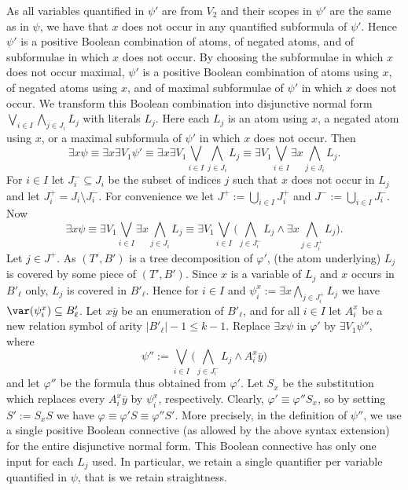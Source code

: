 \documentclass{LMCS}
\renewcommand{\phi}{\varphi}
\begin{document}
As all variables quantified in $\psi'$ are from $V_2$ 
and their scopes in $\psi'$ are the same as in $\psi$, 
we have that $x$ does not occur in any quantified subformula of $\psi'$. 
Hence $\psi'$ is a positive Boolean combination 
of atoms, of negated atoms, and of subformulae in which $x$ does not occur. 
By choosing the subformulae in which $x$ does not occur maximal, 
$\psi'$ is a positive Boolean combination 
of atoms using $x$, of negated atoms using $x$, 
and of maximal subformulae of $\psi'$ in which $x$ does not occur. 
We transform this Boolean combination 
into disjunctive normal form $\bigvee_{i\in I} \bigwedge_{j\in J_i}L_j$ 
with literals $L_j$. 
Here each $L_j$ is an atom using $x$, a negated atom using $x$, 
or a maximal subformula of $\psi'$ in which $x$ does not occur. 
Then 
\[
  \exists x\psi
  \equiv \exists x\exists V_1\psi'
  \equiv \exists x\exists V_1\bigvee_{i\in I} \bigwedge_{j\in J_i}L_j
  \equiv \exists V_1\bigvee_{i\in I}\exists x\bigwedge_{j\in J_i}L_j.
\]
For $i\in I$ let $J_i^-\subseteq J_i$ be 
the subset of indices $j$ such that $x$ does not occur in $L_j$ 
and let $J_i^+ =J_i\setminus J_i^-$. 
For convenience we let $J^+:=\bigcup\limits_{i\in I}J^+_i$ 
and $J^-:=\bigcup\limits_{i\in I}J^-_i$. 
Now 
\[
  \exists x \psi
  \equiv \exists V_1\bigvee_{i\in I}\exists x\bigwedge_{j\in J_i}L_j
  \equiv \exists V_1\bigvee_{i\in I}\big(\bigwedge_{j\in J_i^-}L_j
    \wedge\exists x\bigwedge_{j\in J_i^+}L_j\big).
\]
Let $j\in J^+$. 
As $(T',B')$ is a tree decomposition of $\phi'$, 
(the atom underlying) $L_j$ is covered by some piece of $(T',B')$. 
Since $x$ is a variable of $L_j$ and $x$ occurs in $B'_{\ell}$ only, 
$L_j$ is covered in $B'_{\ell}$. 
Hence for $i\in I$ and $\psi_i^x:=\exists x\bigwedge_{j\in J_i^+}L_j$ 
we have $\var(\psi_i^x)\subseteq B'_{\ell}$. 
Let $x\bar y$ be an enumeration of $B'_{\ell}$, 
and for all $i\in I$ 
let $A_i^x$ be a new relation symbol of arity $|B'_{\ell}|-1\leq k-1$. 
Replace $\exists x\psi$ in $\phi'$ by $\exists V_1\psi''$, where 
\[
  \psi'':=
    \bigvee_{i\in I}\big(\bigwedge_{j\in J_i^-}L_j\wedge A_i^x\bar y \big)
\]
and let $\phi''$ be the formula thus obtained from $\phi'$. 
Let $S_x$ be the substitution which replaces every $A_i^x\bar y$ 
by $\psi_i^x$, respectively. 
Clearly, $\phi' \equiv \phi''S_x$, so by setting $S':=S_x S$ 
we have $\phi \equiv \phi'S \equiv \phi''S'$. 
More precisely, in the definition of $\psi''$, 
we use a single positive Boolean connective 
(as allowed by the above syntax extension) 
for the entire disjunctive normal form. 
This Boolean connective has only one input for each $L_j$ used. 
In particular, we retain a single quantifier 
per variable quantified in $\psi$, that is we retain straightness. 
\end{document}
